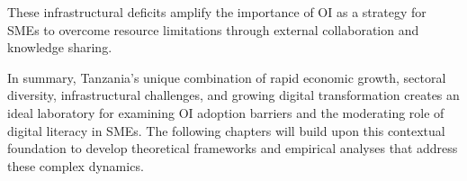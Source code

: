 These infrastructural deficits amplify the importance of OI as a strategy for SMEs to overcome resource limitations through external collaboration and knowledge sharing.

In summary, Tanzania's unique combination of rapid economic growth, sectoral diversity, infrastructural challenges, and growing digital transformation creates an ideal laboratory for examining OI adoption barriers and the moderating role of digital literacy in SMEs. The following chapters will build upon this contextual foundation to develop theoretical frameworks and empirical analyses that address these complex dynamics.